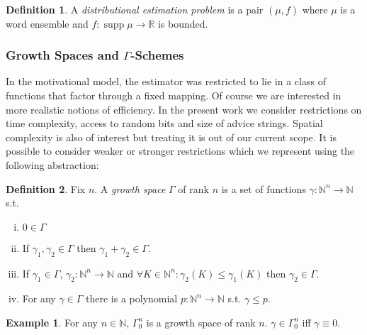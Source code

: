 \documentclass{article}
\numberwithin{equation}{section}
\theoremstyle{definition}
\newtheorem{definition}{Definition}[section]
\newtheorem{example}{Example}[section]
\theoremstyle{plain}
\DeclareMathOperator{\Supp}{supp}
\newcommand{\Nats}{\mathbb{N}}
\newcommand{\Reals}{\mathbb{R}}
\begin{document}
\begin{definition}

A \emph{distributional estimation problem} is a pair $(\mu,f)$ where $\mu$ is a word ensemble and $f: \Supp \mu \rightarrow \Reals$ is bounded.

\end{definition}

\subsubsection{Growth Spaces and \texorpdfstring{$\Gamma$}{Γ}-Schemes}

In the motivational model, the estimator was restricted to lie in a class of functions that factor through a fixed mapping. Of course we are interested in more realistic notions of efficiency. In the present work we consider restrictions on time complexity, access to random bits and size of advice strings. Spatial complexity is also of interest but treating it is out of our current scope. It is possible to consider weaker or stronger restrictions which we represent using the following abstraction:

\begin{samepage}
\begin{definition}

Fix $n$. A \emph{growth space} $\Gamma$ of rank $n$ is a set of functions ${\gamma: \Nats^n \rightarrow \Nats}$ s.t.

\begin{enumerate}[(i)]

\item $0 \in \Gamma$

\item If $\gamma_1, \gamma_2 \in \Gamma$ then $\gamma_1 + \gamma_2 \in \Gamma$.

\item If $\gamma_1 \in \Gamma$, $\gamma_2: \Nats^n \rightarrow \Nats$ and $\forall K \in \Nats^n: \gamma_2(K) \leq \gamma_1(K)$ then $\gamma_2 \in \Gamma$.

\item For any $\gamma \in \Gamma$ there is a polynomial $p: \Nats^n \rightarrow \Nats$ s.t. $\gamma \leq p$.

\end{enumerate}

\end{definition}
\end{samepage}

\begin{example}

For any $n \in \Nats$, $\Gamma_0^n$ is a growth space of rank $n$. $\gamma \in \Gamma_0^n$ iff $\gamma \equiv 0$.

\end{example}
\end{document}
